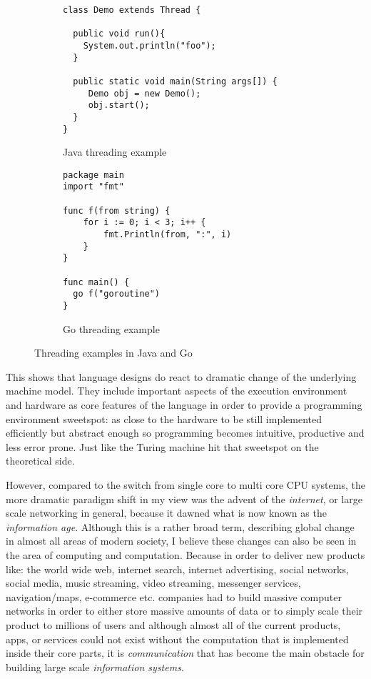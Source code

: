 \begin{figure}[h]
    \begin{subfigure}[b]{0.55\textwidth}

    \begin{lstlisting}
class Demo extends Thread {

  public void run(){
    System.out.println("foo");
  }

  public static void main(String args[]) {
     Demo obj = new Demo();
     obj.start();
  }
}
    \end{lstlisting}

        \caption{Java threading example}
        \label{fig:java-thread}
    \end{subfigure}
    \hfill
    \begin{subfigure}[b]{0.4\textwidth}

    \begin{lstlisting}
package main
import "fmt"

func f(from string) {
    for i := 0; i < 3; i++ {
        fmt.Println(from, ":", i)
    }
}

func main() {
  go f("goroutine")
}

    \end{lstlisting}

        \caption{Go threading example}
        \label{fig:go-thread}
    \end{subfigure}

  \caption{Threading examples in Java and Go}
  \label{thread-examples}

\end{figure}

This shows that language designs do react to dramatic change of the
underlying machine model. They include important aspects of the
execution environment and hardware as core features of the language
in order to provide a programming environment sweetspot: as close
to the hardware to be still implemented efficiently but abstract
enough so programming becomes intuitive, productive and less error prone.
Just like the Turing machine hit that sweetspot on the theoretical side.
\newline

However, compared to the switch from single core to multi core CPU systems,
the more dramatic paradigm shift in my view was the advent of
the \textit{internet}, or large scale networking in general, because it
dawned what is now known as the \textit{information age}. Although this
is a rather broad term, describing global change in almost all areas of
modern society, I believe these changes can also be seen in the area
of computing and computation. Because in order to deliver new products
like: the world wide web, internet search, internet advertising,
social networks, social media, music streaming,
video streaming, messenger services, navigation/maps, e-commerce etc.
companies had to build massive computer networks in order to either store
massive amounts of data or to simply scale their
product to millions of users
and although almost all of the current products, apps, or services
could not exist without the computation that is implemented inside
their core parts, it is \textit{communication} that has become the
main obstacle for building large scale \textit{information systems}.

